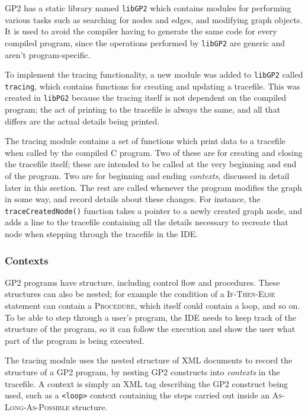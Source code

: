 \documentclass[authoryearcitations]{UoYCSproject}
\begin{document}
GP2 has a static library named \texttt{libGP2} which contains modules for
performing various tasks such as searching for nodes and edges, and modifying
graph objects. It is used to avoid the compiler having to generate the same code
for every compiled program, since the operations performed by \texttt{libGP2}
are generic and aren't program-specific.

To implement the tracing functionality, a new module was added to \texttt{libGP2}
called \texttt{tracing}, which contains functions for creating and updating a
tracefile. This was created in \texttt{libPG2} because the tracing itself is
not dependent on the compiled program; the act of printing to the tracefile is
always the same, and all that differs are the actual details being printed.

The tracing module contains a set of functions which print data to a tracefile
when called by the compiled C program. Two of these are for creating and closing
the tracefile itself; these are intended to be called at the very beginning and
end of the program. Two are for beginning and ending \emph{contexts}, discussed
in detail later in this section. The rest are called whenever the program modifies
the graph in some way, and record details about these changes. For instance, the
\texttt{traceCreatedNode()} function takes a pointer to a newly created graph
node, and adds a line to the tracefile containing all the details necessary to
recreate that node when stepping through the tracefile in the IDE.


\subsubsection{Contexts}
\label{sec:Contexts}

GP2 programs have structure, including control flow and procedures. These
structures can also be nested; for example the condition of a \textsc{If-Then-Else}
statement can contain a \textsc{Procedure}, which itself could contain a loop,
and so on. To be able to step through a user's program, the IDE needs to keep
track of the structure of the program, so it can follow the execution and show
the user what part of the program is being executed.

The tracing module uses the nested structure of XML documents to record the
structure of a GP2 program, by nesting GP2 constructs into \emph{contexts} in the
tracefile. A context is simply an XML tag describing the GP2 construct being
used, such as a \texttt{<loop>} context containing the steps carried out inside
an \textsc{As-Long-As-Possible} structure.
\end{document}

